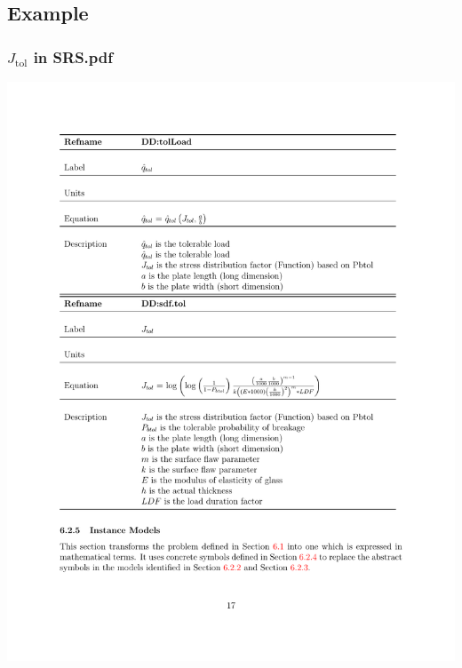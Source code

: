 \documentclass{beamer}
\begin{document}



\subsection[Example]{Example}


\begin{frame}

\frametitle{$J_{\mbox{tol}}$ in SRS.pdf}
\begin{center}
\includegraphics[width=1.0\textwidth]{Jtol_pdf.pdf}
\end{center}
\end{frame}
\end{document}
